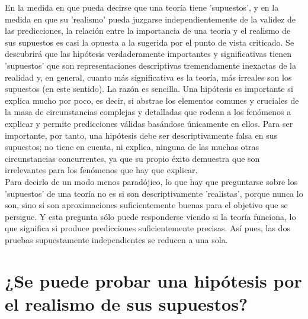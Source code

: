 En la medida en que pueda decirse que una teoría tiene 'supuestos', y en la medida en que su 'realismo' pueda juzgarse independientemente de la validez de las predicciones, la relación entre la importancia de una teoría y el realismo de sus supuestos es casi la opuesta a la sugerida por el punto de vista criticado. Se descubrirá que las hipótesis verdaderamente importantes y significativas tienen 'supuestos' que son representaciones descriptivas tremendamente inexactas de la realidad y, en general, cuanto más significativa es la teoría, más irreales son los supuestos (en este sentido). La razón es sencilla. Una hipótesis es importante si explica mucho por poco, es decir, si abstrae los elementos comunes y cruciales de la masa de circunstancias complejas y detalladas que rodean a los fenómenos a explicar y permite predicciones válidas basándose únicamente en ellos. Para ser importante, por tanto, una hipótesis debe ser descriptivamente falsa en sus supuestos; no tiene en cuenta, ni explica, ninguna de las muchas otras circunstancias concurrentes, ya que su propio éxito demuestra que son irrelevantes para los fenómenos que hay que explicar.\\
Para decirlo de un modo menos paradójico, lo que hay que preguntarse sobre los 'supuestos' de una teoría no es si son descriptivamente 'realistas', porque nunca lo son, sino si son aproximaciones suficientemente buenas para el objetivo que se persigue. Y esta pregunta sólo puede responderse viendo si la teoría funciona, lo que significa si produce predicciones suficientemente precisas. Así pues, las dos pruebas supuestamente independientes se reducen a una sola.

\section{¿Se puede probar una hipótesis por el realismo de sus supuestos?}






